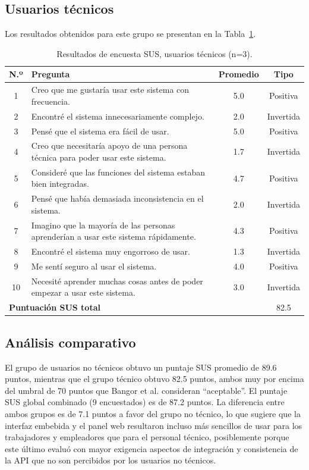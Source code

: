 \documentclass{iccmemoria}
\begin{document}
\subsection{Usuarios técnicos}
Los resultados obtenidos para este grupo se presentan en la Tabla~\ref{tab:sus_tecnicos}.
\begin{table}[H]
\centering
\begin{tabular}{|c|p{8.5cm}|c|c|}
\hline
\textbf{N.º} & \textbf{Pregunta} & \textbf{Promedio} & \textbf{Tipo} \\
\hline
1 & Creo que me gustaría usar este sistema con frecuencia. & 5.0 & Positiva \\
2 & Encontré el sistema innecesariamente complejo. & 2.0 & Invertida \\
3 & Pensé que el sistema era fácil de usar. & 5.0 & Positiva \\
4 & Creo que necesitaría apoyo de una persona técnica para poder usar este sistema. & 1.7 & Invertida \\
5 & Consideré que las funciones del sistema estaban bien integradas. & 4.7 & Positiva \\
6 & Pensé que había demasiada inconsistencia en el sistema. & 2.0 & Invertida \\
7 & Imagino que la mayoría de las personas aprenderían a usar este sistema rápidamente. & 4.3 & Positiva \\
8 & Encontré el sistema muy engorroso de usar. & 1.3 & Invertida \\
9 & Me sentí seguro al usar el sistema. & 4.0 & Positiva \\
10 & Necesité aprender muchas cosas antes de poder empezar a usar este sistema. & 3.0 & Invertida \\
\hline
\multicolumn{3}{|l|}{\textbf{Puntuación SUS total}} & 82.5 \\
\hline
\end{tabular}
\caption{Resultados de encuesta SUS, usuarios técnicos (n=3).}
\label{tab:sus_tecnicos}
\end{table}

\subsection{Análisis comparativo}
El grupo de usuarios no técnicos obtuvo un puntaje SUS promedio de 89.6 puntos, mientras que el grupo técnico obtuvo 82.5 puntos, ambos muy por encima del umbral de 70 puntos que Bangor et al. \cite{bangor2008} consideran ``aceptable''. El puntaje SUS global combinado (9 encuestados) es de 87.2 puntos. La diferencia entre ambos grupos es de 7.1 puntos a favor del grupo no técnico, lo que sugiere que la interfaz embebida y el panel web resultaron incluso más sencillos de usar para los trabajadores y empleadores que para el personal técnico, posiblemente porque este último evaluó con mayor exigencia aspectos de integración y consistencia de la API que no son percibidos por los usuarios no técnicos.
\end{document}

